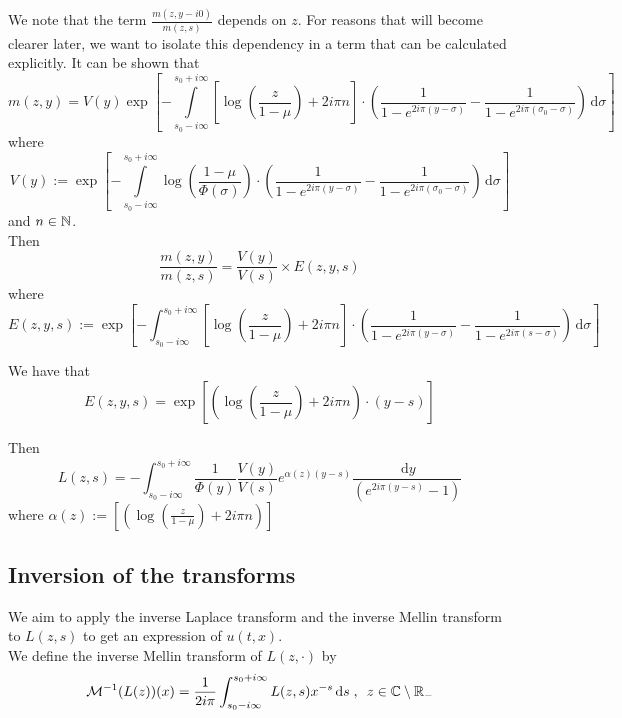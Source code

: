 \documentclass[11pt]{amsart}
\newcommand{\diff}{\,\mathrm{d}}
\begin{document}
We note that the term $\frac{m(z,y-i0)}{m(z,s)}$ depends on $z$. For reasons that will become clearer later, we want to isolate this dependency in a term that can be calculated explicitly. 
It can be shown that 
\begin{equation*}
    m(z,y) = V(y)
    \exp \left[
    - \int\limits_{s_0-i\infty}^{s_0+i\infty} \left[\log \left( \frac{z}{1-\mu}\right) + 2i\pi n\right]
    \cdot \left(
        \frac{1}{1-e^{2i\pi(y-\sigma)}} - \frac{1}{1-e^{2i\pi(\sigma_0-\sigma)}}
     \right) \diff \sigma
    \right]
\end{equation*}
where 
$$ V(y) := \exp \left[
    - \int\limits_{s_0-i\infty}^{s_0+i\infty}\log \left( \frac{1-\mu}{\Phi(\sigma)}\right)
    \cdot \left(
        \frac{1}{1-e^{2i\pi(y-\sigma)}} - \frac{1}{1-e^{2i\pi(\sigma_0-\sigma)}}
     \right) \diff \sigma 
    \right]  $$ 
and $n \in \mathbb{N}$.\\

Then 
\begin{equation*}
    \frac{m(z,y)}{m(z,s)} 
    = 
    \frac{V(y)}{V(s)} \times E(z,y,s)
\end{equation*}
where $$E(z,y,s) := \exp \left[
    - \int_{s_0-i\infty}^{s_0+i\infty} \left[\log \left( \frac{z}{1-\mu}\right) + 2i\pi n\right]
    \cdot \left(
        \frac{1}{1-e^{2i\pi(y-\sigma)}} - \frac{1}{1-e^{2i\pi(s-\sigma)}}
     \right) \diff \sigma \right]
     $$

We have that
\begin{equation*}
    E(z,y,s) 
    = 
    \exp
        \left[
     \left(\log \left( \frac{z}{1-\mu}\right) + 2i\pi n\right)
    \cdot (y-s)\right]
\end{equation*}

Then 
\begin{equation}\label{eq:exprL}
    L(z,s) 
    = 
   - \int_{s_0-i\infty}^{s_0+i\infty} \frac{1}{\Phi(y)} \frac{V(y)}{V(s)} e^{ \alpha(z)(y-s)}
   \frac{\diff y}{(e^{2i\pi(y-s)}-1)}
\end{equation}
where $\alpha(z) :=  \left[
    \left(\log \left( \frac{z}{1-\mu}\right) + 2i\pi n\right)
    \right]$
\subsection{Inversion of the transforms}

We aim to apply the inverse Laplace transform and the inverse Mellin transform to $L(z,s)$ to get an expression of $u(t,x)$.\\

We define the inverse Mellin transform of $L(z,\cdot)$ by 
\begin{equation*}
    \Mcal^{-1}(L(z))(x) = \frac{1}{2i\pi} \int_{s_0-i\infty}^{s_0+i\infty} L(z,s)x^{-s}\diff s
    \eqsepv
    z \in \CC \setminus \RR_-
\end{equation*}
\end{document}
